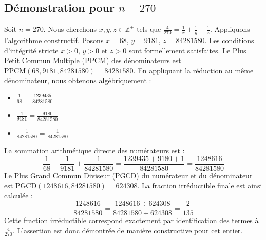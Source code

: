 \documentclass[11pt,a4paper]{article}
\begin{document}
\subsection{Démonstration pour $n = 270$}
Soit $n = 270$. Nous cherchons $x, y, z \in \mathbb{Z}^{+}$ tels que $\frac{4}{270} = \frac{1}{x} + \frac{1}{y} + \frac{1}{z}$.
Appliquons l'algorithme constructif. Posons $x = 68$, $y = 9181$, $z = 84281580$.
Les conditions d'intégrité stricte $x > 0$, $y > 0$ et $z > 0$ sont formellement satisfaites.
Le Plus Petit Commun Multiple (PPCM) des dénominateurs est $\text{PPCM}(68, 9181, 84281580) = 84281580$.
En appliquant la réduction au même dénominateur, nous obtenons algébriquement :
\begin{itemize}
    \item $\frac{1}{68} = \frac{1239435}{84281580}$
    \item $\frac{1}{9181} = \frac{9180}{84281580}$
    \item $\frac{1}{84281580} = \frac{1}{84281580}$
\end{itemize}
La sommation arithmétique directe des numérateurs est :
$$ \frac{1}{68} + \frac{1}{9181} + \frac{1}{84281580} = \frac{1239435 + 9180 + 1}{84281580} = \frac{1248616}{84281580} $$
Le Plus Grand Commun Diviseur (PGCD) du numérateur et du dénominateur est $\text{PGCD}(1248616, 84281580) = 624308$.
La fraction irréductible finale est ainsi calculée :
$$ \frac{1248616}{84281580} = \frac{1248616 \div 624308}{84281580 \div 624308} = \frac{2}{135} $$
Cette fraction irréductible correspond exactement par identification des termes à $\frac{4}{270}$. L'assertion est donc démontrée de manière constructive pour cet entier.
\end{document}
